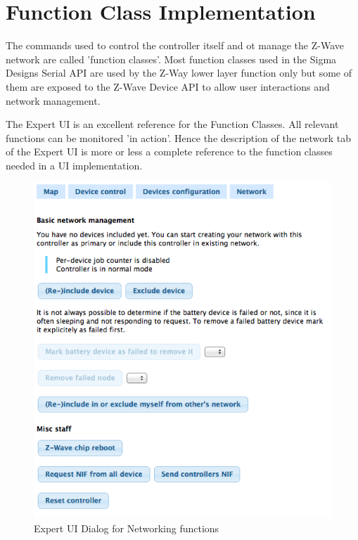
\section{Function Class Implementation}
\label{c2:fc}

The commands used to control the controller itself and ot manage the Z-Wave network
are called 'function classes'. Most function classes used in the Sigma Designs
Serial API are used by the Z-Way lower layer function only but some of them 
are exposed to the Z-Wave Device API to allow user interactions and network management.

The Expert UI is an excellent reference for the Function Classes. All relevant functions 
can be monitored 'in action'. Hence the description of the network tab of the Expert 
UI is more or less a complete reference to the function classes needed in a UI implementation.

 
\begin{figure} 
\begin{center}
\includegraphics[scale=0.8]{pics/network1.png}
\caption{Expert UI Dialog for Networking functions}
\label{c1:network1} 
\end{center} \end{figure}

